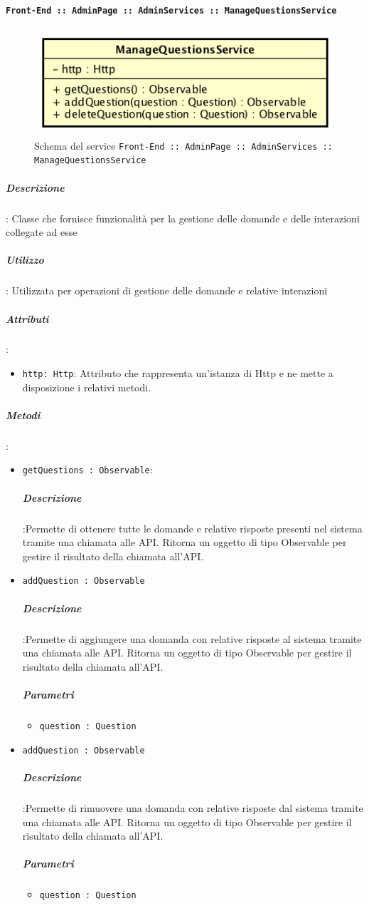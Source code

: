 \documentclass[../DefinizioneDiProdotto_v2.0.0.tex]{subfiles}
\begin{document}
					\newpage
				\paragraph{\texttt{Front-End :: AdminPage :: AdminServices :: ManageQuestionsService}}
				\acapo
				\begin{figure}[!h]
					\centering
					\includegraphics[scale=0.6]{Architettura/Front-End/AdminPage/AdminServices/ManageQuestionsService.png}
					\caption{Schema del service \texttt{Front-End :: AdminPage :: AdminServices :: ManageQuestionsService}}
				\end{figure}

					\subparagraph{Descrizione}: Classe che fornisce funzionalità per la gestione delle domande e delle interazioni collegate ad esse
					\subparagraph{Utilizzo}: Utilizzata per operazioni di gestione delle domande e relative interazioni
					\subparagraph{Attributi}:
			      	\begin{itemize}
						\item \texttt{http: Http}: Attributo che rappresenta un'istanza di Http e ne mette a disposizione i relativi metodi.
			      	\end{itemize}
					\subparagraph{Metodi}:
	      	      	\begin{itemize}
						\item \texttt{getQuestions : Observable}:
						\subparagraph{Descrizione}:Permette di ottenere tutte le domande e relative risposte presenti nel sistema tramite una chiamata alle API. Ritorna un oggetto di tipo Observable per gestire il risultato della chiamata all'API.

						\item \texttt{addQuestion : Observable}
						\subparagraph{Descrizione}:Permette di aggiungere una domanda con relative risposte al sistema tramite una chiamata alle API. Ritorna un oggetto di tipo Observable per gestire il risultato della chiamata all'API.
						\subparagraph{Parametri}\begin{itemize}
							\item \texttt{question : Question}
						\end{itemize}

						\item \texttt{addQuestion : Observable}
						\subparagraph{Descrizione}:Permette di rimuovere una domanda con relative risposte dal sistema tramite una chiamata alle API. Ritorna un oggetto di tipo Observable per gestire il risultato della chiamata all'API.
						\subparagraph{Parametri}\begin{itemize}
							\item \texttt{question : Question}
						\end{itemize}
	      	      	\end{itemize}
\newpage
\end{document}
